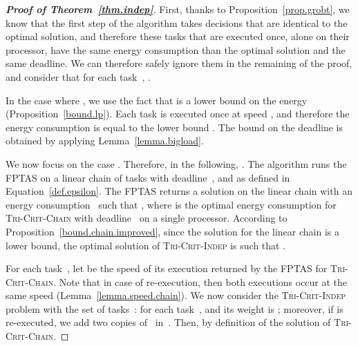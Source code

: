 \documentclass[a4paper]{article}
\theoremstyle{plain}
\theoremstyle{definition}
\theoremstyle{remark}
\newcommand{\chain}{\textsc{Tri-Crit-Chain}\xspace}
\newcommand{\indep}{\textsc{Tri-Crit-In\-dep}\xspace}
\begin{document}
\begin{proof}[{\bf Proof of Theorem~\ref{thm.indep}}]
First, thanks to Proposition~\ref{prop.grobt}, we know that the first
step of the algorithm takes decisions that are identical to the
optimal solution, and therefore these tasks that are executed once,
alone on their processor, have the same energy consumption than the
optimal solution and the same deadline. We can therefore safely ignore
them in the remaining of the proof, and consider that for each task~, 
. 

\medskip
In the case where , we use the fact that  is a lower bound on the
  energy (Proposition~\ref{bound.lp}).  Each task is executed once
  at speed , and therefore the
  energy consumption is equal to the lower bound . 
  The bound on the deadline is obtained by applying
  Lemma~\ref{lemma.bigload}. 






\medskip
We now focus on the case . 
Therefore, in the following, .  The
algorithm runs the FPTAS on a linear chain of tasks with
deadline~, and  as defined in
Equation~\eqref{def.epsilon}. The FPTAS returns a solution on the
linear chain with an energy consumption~ such that
, where  is
the  optimal energy consumption for \chain
with deadline~ on a single processor. According to
Proposition~\ref{bound.chain.improved}, since the solution for the
linear chain is a lower bound, the optimal solution of \indep is such that 
. 





For each task~, let  be the speed of its
execution returned by the FPTAS for \chain. Note that in case of
re-execution, then both executions occur at the same speed
(Lemma~\ref{lemma.speed.chain}).  We now consider the \indep problem
with the set of tasks~: for each task~,
 and its weight is ; moreover, if  is re-executed,
we add two copies of~ in~.  Then,
 by
definition of the solution of \chain.



\end{proof}
\end{document}
